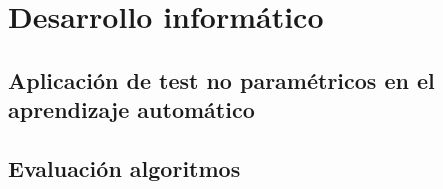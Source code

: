 %
%

\chapter{Desarrollo informático}

\section*{Aplicación de test no paramétricos en el aprendizaje automático}

\section*{Evaluación algoritmos }
%
